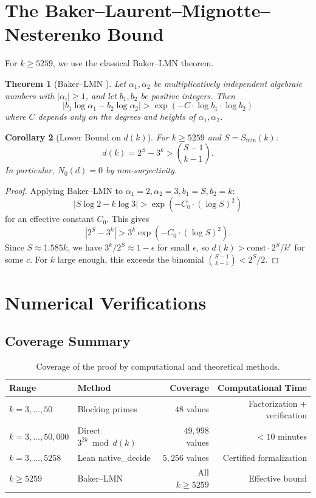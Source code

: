 \documentclass[12pt,a4paper]{amsart}
\theoremstyle{plain}
\newtheorem{theorem}{Theorem}[section]
\newtheorem{corollary}[theorem]{Corollary}
\theoremstyle{definition}
\begin{document}
\section{The Baker--Laurent--Mignotte--Nesterenko Bound}
\label{sec:baker_lmn}

For $k \geq 5259$, we use the classical Baker--LMN theorem.

\begin{theorem}[Baker--LMN \cite{Baker1966,LaurentMignottNesterenko1995,Matveev2000}]
\label{thm:baker_lmn}
Let $\alpha_1, \alpha_2$ be multiplicatively independent algebraic numbers with $|\alpha_i| \geq 1$, and let $b_1, b_2$ be positive integers. Then
\[
|b_1 \log \alpha_1 - b_2 \log \alpha_2| > \exp(-C \cdot \log b_1 \cdot \log b_2)
\]
where $C$ depends only on the degrees and heights of $\alpha_1, \alpha_2$.
\end{theorem}

\begin{corollary}[Lower Bound on $d(k)$]
\label{cor:lmn_bound}
For $k \geq 5259$ and $S = S_{\min}(k)$:
\[
d(k) = 2^S - 3^k > \binom{S-1}{k-1}.
\]
In particular, $N_0(d) = 0$ by non-surjectivity.
\end{corollary}

\begin{proof}
Applying Baker--LMN to $\alpha_1 = 2, \alpha_2 = 3, b_1 = S, b_2 = k$:
\[
|S \log 2 - k \log 3| > \exp(-C_0 \cdot (\log S)^2)
\]
for an effective constant $C_0$. This gives
\[
|2^S - 3^k| > 3^k \exp(-C_0 \cdot (\log S)^2).
\]
Since $S \approx 1.585 k$, we have $3^k / 2^S \approx 1 - \epsilon$ for small $\epsilon$, so $d(k) > \text{const} \cdot 2^S / k^c$ for some $c$. For $k$ large enough, this exceeds the binomial $\binom{S-1}{k-1} < 2^S / 2$.
\end{proof}

\section{Numerical Verifications}
\label{sec:numerical}

\subsection{Coverage Summary}

\begin{table}[h!]
\centering
\begin{tabular}{@{}llrr@{}}
\toprule
Range & Method & Coverage & Computational Time \\
\midrule
$k = 3, \ldots, 50$ & Blocking primes & $48$ values & Factorization + verification \\
$k = 3, \ldots, 50{,}000$ & Direct $3^{2k} \bmod d(k)$ & $49{,}998$ values & $< 10$ minutes \\
$k = 3, \ldots, 5258$ & Lean native\_decide & $5{,}256$ values & Certified formalization \\
$k \geq 5259$ & Baker--LMN & All $k \geq 5259$ & Effective bound \\
\bottomrule
\end{tabular}
\caption{Coverage of the proof by computational and theoretical methods.}
\label{tab:coverage}
\end{table}
\end{document}
